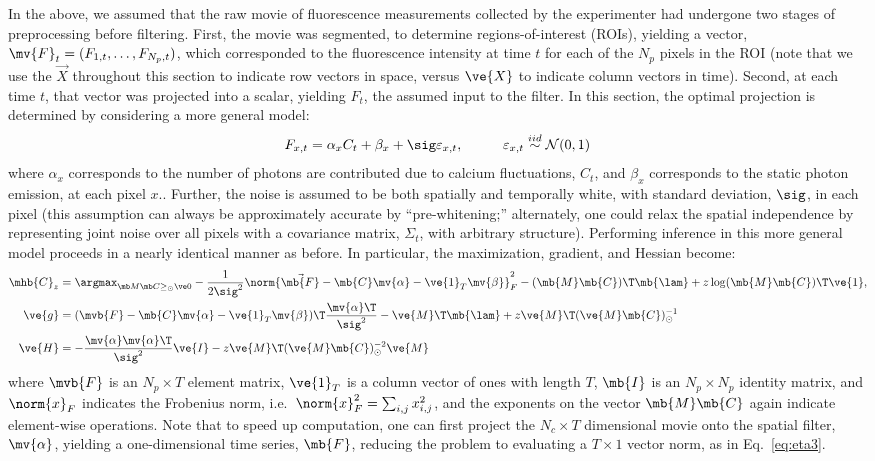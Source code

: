 In the above, we assumed that the raw movie of fluorescence measurements collected by the experimenter had undergone two stages of preprocessing before filtering.  First, the movie was segmented, to determine regions-of-interest (ROIs), yielding a vector, $\mv{F}_t=(F_{1,t}, \ldots, F_{N_p,t})$, which corresponded to the fluorescence intensity at time $t$ for each of the $N_p$ pixels in the ROI (note that we use the $\vec{X}$ throughout this section to indicate row vectors in space, versus $\ve{X}$ to indicate column vectors in time).  Second, at each time $t$, that vector was projected into a scalar, yielding $F_t$, the assumed input to the filter.  In this section, the optimal projection is determined by considering a more general model:
\begin{align} \label{eq:bF}
F_{x,t} &= \alpha_x C_t + \beta_x +  \sig \varepsilon_{x,t}, \qquad &\varepsilon_{x,t} \overset{iid}{\sim} \mathcal{N}(0,1)   
\end{align}
\noindent where $\alpha_x$ corresponds to the number of photons are contributed due to calcium fluctuations, $C_t$, and $\beta_x$ corresponds to the static photon emission, at each pixel $x$..  Further, the noise is assumed to be both spatially and temporally white, with standard deviation, $\sig$, in each pixel (this assumption can always be approximately accurate by ``pre-whitening;'' alternately, one could relax the spatial independence by representing joint noise over all pixels with a covariance matrix, $\Sigma_{t}$, with arbitrary structure).  Performing inference in this more general model proceeds in a  nearly identical manner as before. In particular, the maximization, gradient, and Hessian become:
\begin{align} 
\mhb{C}_{\zzz} 
&= \az  -\frac{1}{2 \sig^2} \norm{\vec{\mb{F}} - \mb{C} \mv{\alpha} - \ve{1}_T \mv{\beta}}_F^2 - (\mb{M} \mb{C} )\T \mb{\lam}  + \zzz \log(\mb{M} \mb{C})\T\ve{1},  \label{eq:eta4}\\
\ve{g} &= (\mvb{F} - \mb{C} \mv{\alpha} - \ve{1}_T \mv{\beta})\T\frac{\mv{\alpha}\T}{\sig^2} - \ve{M}\T\mb{\lam} + \zzz \ve{M}\T (\ve{M} \mb{C})_\odot^{-1} \label{eq:g2} \\
\ve{H} &= -\frac{\mv{\alpha} \mv{\alpha}\T}{\sig^2} \ve{I} - \zzz \ve{M}\T (\ve{M} \mb{C})_\odot^{-2} \ve{M} \label{eq:H2}
\end{align}
\noindent where $\mvb{F}$ is an $N_p \times T$ element matrix, $\ve{1}_T$ is a column vector of ones with length $T$, $\mb{I}$ is an $N_p \times N_p$ identity matrix, and $\norm{x}_F$ indicates the Frobenius norm, i.e.\ $\norm{x}_F^2= \sum_{i,j} x_{i,j}^2$, and the exponents on the vector $\mb{M}\mb{C}$ again indicate element-wise operations.  Note that to speed up computation, one can first project the $N_c \times T$ dimensional movie onto the spatial filter, $\mv{\alpha}$, yielding a one-dimensional time series, $\mb{F}$, reducing the problem to evaluating a $T \times 1$ vector norm, as in Eq.~\eqref{eq:eta3}.


